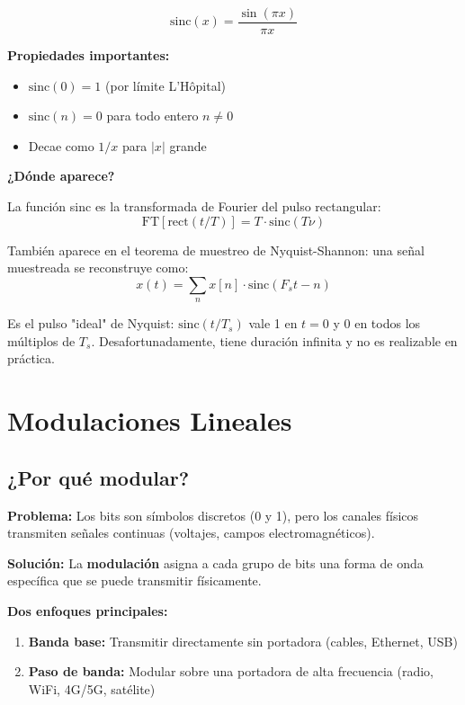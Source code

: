 \documentclass[11pt,a4paper]{article}
\begin{document}
\begin{tcolorbox}[colback=azulclaro!20,colframe=azuloscuro,title=\textbf{Función sinc}]
$$\boxed{\text{sinc}(x) = \frac{\sin(\pi x)}{\pi x}}$$

\textbf{Propiedades importantes:}
\begin{itemize}
\item $\text{sinc}(0) = 1$ (por límite L'Hôpital)
\item $\text{sinc}(n) = 0$ para todo entero $n \neq 0$
\item Decae como $1/x$ para $|x|$ grande
\end{itemize}

\textbf{¿Dónde aparece?}

La función sinc es la transformada de Fourier del pulso rectangular:
$$\text{FT}[\text{rect}(t/T)] = T \cdot \text{sinc}(T\nu)$$

También aparece en el teorema de muestreo de Nyquist-Shannon: una señal muestreada se reconstruye como:
$$x(t) = \sum_{n} x[n] \cdot \text{sinc}(F_s t - n)$$

Es el pulso "ideal" de Nyquist: $\text{sinc}(t/T_s)$ vale 1 en $t=0$ y 0 en todos los múltiplos de $T_s$. Desafortunadamente, tiene duración infinita y no es realizable en práctica.
\end{tcolorbox}

\newpage

\section{Modulaciones Lineales}

\subsection{¿Por qué modular?}

\textbf{Problema:} Los bits son símbolos discretos (0 y 1), pero los canales físicos transmiten señales continuas (voltajes, campos electromagnéticos).

\textbf{Solución:} La \textbf{modulación} asigna a cada grupo de bits una forma de onda específica que se puede transmitir físicamente.

\textbf{Dos enfoques principales:}
\begin{enumerate}
\item \textbf{Banda base:} Transmitir directamente sin portadora (cables, Ethernet, USB)
\item \textbf{Paso de banda:} Modular sobre una portadora de alta frecuencia (radio, WiFi, 4G/5G, satélite)
\end{enumerate}
\end{document}
